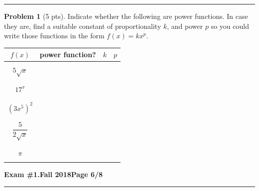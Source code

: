 \documentclass[12pt]{article}
\theoremstyle{definition}
\newtheorem{problem}{Problem}
\begin{document}
\vspace{1cm}
\hrule

\begin{problem}[5 pts]
  Indicate whether the following are power functions. In case they are, find a suitable constant of proportionality $k$,
  and power $p$ so you could write those functions in the form $f(x) = kx^p$. 
  \begin{center}
    \begin{tabular}{|c|c|c|c|}
      \hline
      $f(x)$ & power function? & $k$ & $p$ \\
      \hline
      \hline
             &&& \\
      $5\sqrt{x}$ &&\hspace{1cm} & \hspace{1cm} \\
             &&& \\
      \hline
             &&& \\
      $17^x$ &&& \\
             &&& \\
      \hline
             &&& \\
      $(3x^5)^2$ &&& \\
             &&& \\
      \hline
             &&& \\
      $\dfrac{5}{2\sqrt{x}}$ &&& \\
             &&& \\
      \hline
             &&& \\
      $\pi$ &&& \\
             &&& \\
      \hline
    \end{tabular}
  \end{center}
\end{problem}
\newpage


\hfill{\large\bf Exam \#1.}\hfill{\large\bf  Fall 2018}\hfill{\large\bf Page 6/8}\hrule

\bigskip
\end{document}
